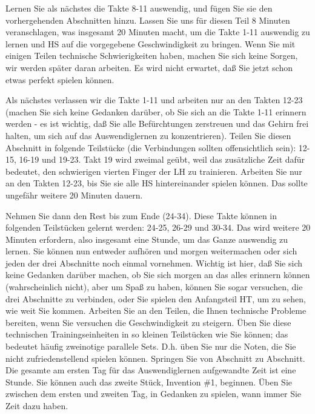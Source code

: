 Lernen Sie als nächstes die Takte 8-11 auswendig, und fügen Sie sie den vorhergehenden Abschnitten hinzu.
Lassen Sie uns für diesen Teil 8 Minuten veranschlagen, was insgesamt 20 Minuten macht, um die Takte 1-11 auswendig zu lernen und HS auf die vorgegebene Geschwindigkeit zu bringen.
Wenn Sie mit einigen Teilen technische Schwierigkeiten haben, machen Sie sich keine Sorgen, wir werden später daran arbeiten.
Es wird nicht erwartet, daß Sie jetzt schon etwas perfekt spielen können.

Als nächstes verlassen wir die Takte 1-11 und arbeiten nur an den Takten 12-23 (machen Sie sich keine Gedanken darüber, ob Sie sich an die Takte 1-11 erinnern werden - es ist wichtig, daß Sie alle Befürchtungen zerstreuen und das Gehirn frei halten, um sich auf das Auswendiglernen zu konzentrieren).
Teilen Sie diesen Abschnitt in folgende Teilstücke (die Verbindungen sollten offensichtlich sein): 12-15, 16-19 und 19-23.
Takt 19 wird zweimal geübt, weil das zusätzliche Zeit dafür bedeutet, den schwierigen vierten Finger der LH zu trainieren.
Arbeiten Sie nur an den Takten 12-23, bis Sie sie alle HS hintereinander spielen können.
Das sollte ungefähr weitere 20 Minuten dauern.

Nehmen Sie dann den Rest bis zum Ende (24-34).
Diese Takte können in folgenden Teilstücken gelernt werden: 24-25, 26-29 und 30-34.
Das wird weitere 20 Minuten erfordern, also insgesamt eine Stunde, um das Ganze auswendig zu lernen.
Sie können nun entweder aufhören und morgen weitermachen oder sich jeden der drei Abschnitte noch einmal vornehmen.
Wichtig ist hier, daß Sie sich keine Gedanken darüber machen, ob Sie sich morgen an das alles erinnern können (wahrscheinlich nicht), aber um Spaß zu haben, können Sie sogar versuchen, die drei Abschnitte zu verbinden, oder Sie spielen den Anfangsteil HT, um zu sehen, wie weit Sie kommen.
Arbeiten Sie an den Teilen, die Ihnen technische Probleme bereiten, wenn Sie versuchen die Geschwindigkeit zu steigern.
Üben Sie diese technischen Trainingseinheiten in so kleinen Teilstücken wie Sie können; das bedeutet häufig zweinotige parallele Sets.
D.h. üben Sie nur die Noten, die Sie nicht zufriedenstellend spielen können.
Springen Sie von Abschnitt zu Abschnitt.
Die gesamte am ersten Tag für das Auswendiglernen aufgewandte Zeit ist eine Stunde.
Sie können auch das zweite Stück, Invention \#1, beginnen.
Üben Sie zwischen dem ersten und zweiten Tag, in Gedanken zu spielen, wann immer Sie Zeit dazu haben.

